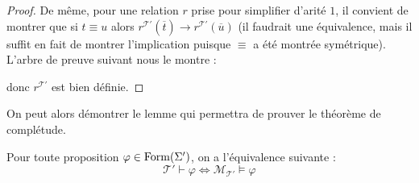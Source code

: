 \begin{proof}
  De même, pour une relation $r$ prise pour simplifier d'arité $1$, il convient
  de montrer que si $t\equiv u$ alors
  $r^{\mathcal T'}(\overline t)\to r^{\mathcal T'}(\overline u)$ (il faudrait une
  équivalence, mais il suffit en fait de montrer l'implication puisque $\equiv$
  a été montrée symétrique). L'arbre de preuve suivant nous le montre :
  \begin{prooftree}
  \end{prooftree}
  donc $r^{\mathcal T'}$ est bien définie.
\end{proof}

On peut alors démontrer le lemme qui permettra de prouver le théorème de
complétude.

\begin{lemma}
  Pour toute proposition $\varphi \in \Formula(\Sigma')$, on a l'équivalence
  suivante :
  \[\mathcal T' \vdash \varphi \iff \mathcal M_{\mathcal T'}\models \varphi\]
\end{lemma}

